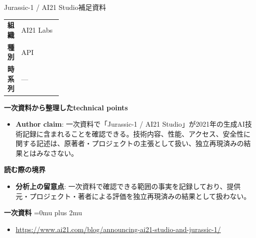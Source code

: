 \begin{technicalnote}{Jurassic-1 / AI21 Studio}{補足資料}
\begingroup
\begin{tabularx}{\linewidth}{@{}>{\bfseries}p{0.22\linewidth}X@{}}
組織 & AI21 Labs \\
種別 & API \\
時系列 & — \\
\end{tabularx}
\smallskip
{\bfseries 一次資料から整理したtechnical points}
\begin{itemize}[leftmargin=1.5em,itemsep=0.35em]
\item \textbf{Author claim}: 一次資料で「Jurassic-1 / AI21 Studio」が2021年の生成AI技術記録に含まれることを確認できる。技術内容、性能、アクセス、安全性に関する記述は、原著者・プロジェクトの主張として扱い、独立再現済みの結果とはみなさない。
\end{itemize}
\begin{minipage}{\linewidth}
{\bfseries 読む際の境界}
\begin{itemize}[leftmargin=1.5em,itemsep=0.35em]
\item \textbf{分析上の留意点}: 一次資料で確認できる範囲の事実を記録しており、提供元・プロジェクト・著者による評価を独立再現済みの結果として扱わない。
\end{itemize}
\begin{samepage}
{\bfseries 一次資料}
\begingroup\sloppy
\Urlmuskip=0mu plus 2mu\relax
\begin{itemize}[leftmargin=1.5em,itemsep=0.25em]
\item {\scriptsize\url{https://www.ai21.com/blog/announcing-ai21-studio-and-jurassic-1/}}
\end{itemize}
\endgroup
\end{samepage}
\end{minipage}
\endgroup
\end{technicalnote}
\medskip

